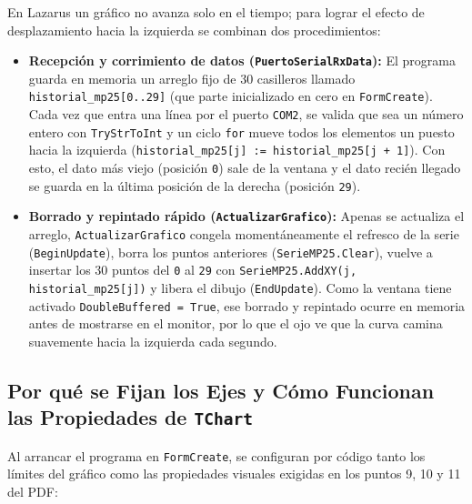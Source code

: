 \documentclass[11pt,a4paper]{article}
\begin{document}
En Lazarus un gráfico no avanza solo en el tiempo; para lograr el efecto de desplazamiento hacia la izquierda se combinan dos procedimientos:

\begin{itemize}[leftmargin=1.5em, itemsep=0.3em]
    \item \textbf{Recepción y corrimiento de datos (\texttt{PuertoSerialRxData}):}
    El programa guarda en memoria un arreglo fijo de 30 casilleros llamado \texttt{historial\_mp25[0..29]} (que parte inicializado en cero en \texttt{FormCreate}). Cada vez que entra una línea por el puerto \texttt{COM2}, se valida que sea un número entero con \texttt{TryStrToInt} y un ciclo \texttt{for} mueve todos los elementos un puesto hacia la izquierda (\texttt{historial\_mp25[j] := historial\_mp25[j + 1]}). Con esto, el dato más viejo (posición \texttt{0}) sale de la ventana y el dato recién llegado se guarda en la última posición de la derecha (posición \texttt{29}).

    \item \textbf{Borrado y repintado rápido (\texttt{ActualizarGrafico}):}
    Apenas se actualiza el arreglo, \texttt{ActualizarGrafico} congela momentáneamente el refresco de la serie (\texttt{BeginUpdate}), borra los puntos anteriores (\texttt{SerieMP25.Clear}), vuelve a insertar los 30 puntos del \texttt{0} al \texttt{29} con \texttt{SerieMP25.AddXY(j, historial\_mp25[j])} y libera el dibujo (\texttt{EndUpdate}). Como la ventana tiene activado \texttt{DoubleBuffered = True}, ese borrado y repintado ocurre en memoria antes de mostrarse en el monitor, por lo que el ojo ve que la curva camina suavemente hacia la izquierda cada segundo.
\end{itemize}

\subsection{Por qué se Fijan los Ejes y Cómo Funcionan las Propiedades de \texttt{TChart}}

Al arrancar el programa en \texttt{FormCreate}, se configuran por código tanto los límites del gráfico como las propiedades visuales exigidas en los puntos 9, 10 y 11 del PDF:
\end{document}
